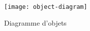 \begin{figure}[ht]
    \centering
    \caption{Diagramme d'objets}
    \texttt{[image: object-diagram]}
    \label{fig:object-diagram}
\end{figure}
\pagebreak

